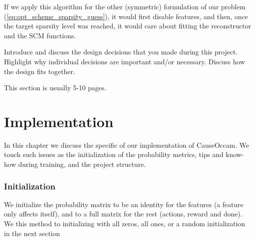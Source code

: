 \documentclass[a4paper,11pt,oneside]{report}
\newcommand{\sysname}{CauseOccam\xspace}
\begin{document}
If we apply this algorithm for the other (symmetric) formulation of our problem (\autoref{eq:opt_scheme_sparsity_guess}), it would first disable features, and then, once the target sparsity level was reached, it would care about fitting the reconstructor and the SCM functions.


Introduce and discuss the design decisions that you made during this project.
Highlight why individual decisions are important and/or necessary. Discuss
how the design fits together.

This section is usually 5-10 pages.


\chapter{Implementation}
\label{ch:implementation}
In this chapter we discuss the specific of our implementation of \sysname. We touch such issues as the initialization of the probability metrics, tips and know-how during training, and the project structure.

\subsection{Initialization}
We initialize the probability matrix to be an identity for the features (a feature only affects itself), and to a full matrix for the rest (actions, reward and done). We this method to initializing with all zeros, all ones, or a random initialization in the next section
\end{document}

